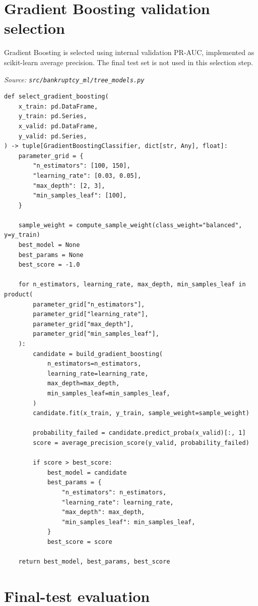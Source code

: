 \documentclass[10pt]{article}
\begin{document}
\section{Gradient Boosting validation selection}

Gradient Boosting is selected using internal validation PR-AUC, implemented as
scikit-learn average precision. The final test set is not used in this
selection step.

\textit{Source: \texttt{src/bankruptcy\_ml/tree\_models.py}}

\begin{lstlisting}
def select_gradient_boosting(
    x_train: pd.DataFrame,
    y_train: pd.Series,
    x_valid: pd.DataFrame,
    y_valid: pd.Series,
) -> tuple[GradientBoostingClassifier, dict[str, Any], float]:
    parameter_grid = {
        "n_estimators": [100, 150],
        "learning_rate": [0.03, 0.05],
        "max_depth": [2, 3],
        "min_samples_leaf": [100],
    }

    sample_weight = compute_sample_weight(class_weight="balanced", y=y_train)
    best_model = None
    best_params = None
    best_score = -1.0

    for n_estimators, learning_rate, max_depth, min_samples_leaf in product(
        parameter_grid["n_estimators"],
        parameter_grid["learning_rate"],
        parameter_grid["max_depth"],
        parameter_grid["min_samples_leaf"],
    ):
        candidate = build_gradient_boosting(
            n_estimators=n_estimators,
            learning_rate=learning_rate,
            max_depth=max_depth,
            min_samples_leaf=min_samples_leaf,
        )
        candidate.fit(x_train, y_train, sample_weight=sample_weight)

        probability_failed = candidate.predict_proba(x_valid)[:, 1]
        score = average_precision_score(y_valid, probability_failed)

        if score > best_score:
            best_model = candidate
            best_params = {
                "n_estimators": n_estimators,
                "learning_rate": learning_rate,
                "max_depth": max_depth,
                "min_samples_leaf": min_samples_leaf,
            }
            best_score = score

    return best_model, best_params, best_score
\end{lstlisting}

\section{Final-test evaluation}
\end{document}
